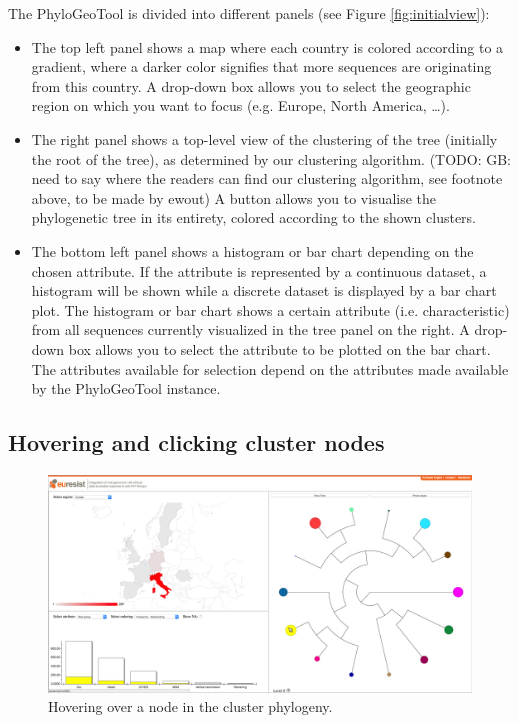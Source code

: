 \documentclass[a4paper, 11pt]{article} %
\begin{document}
The PhyloGeoTool is divided into different panels (see Figure \ref{fig:initialview}): 
\begin{itemize}
  \item The top left panel shows a map where each country is colored according to a gradient, where a darker color signifies that more sequences are originating from this country. 
    A drop-down box allows you to select the geographic region on which you want to focus (e.g. Europe, North America, \ldots).
  \item The right panel shows a top-level view of the clustering of the tree (initially the root of the tree), as determined by our clustering algorithm. (TODO: GB: need to say where the readers can find our clustering algorithm, see footnote above, to be made by ewout)
  A button allows you to visualise the phylogenetic tree in its entirety, colored according to the shown clusters.
  \item The bottom left panel shows a histogram or bar chart depending on the chosen attribute. If the attribute is represented by a continuous dataset, a histogram will be shown while a discrete dataset is displayed by a bar chart plot.
  The histogram or bar chart shows a certain attribute (i.e. characteristic) from all sequences currently visualized in the tree panel on the right. 
  A drop-down box allows you to select the attribute to be plotted on the bar chart. 
  The attributes available for selection depend on the attributes made available by the PhyloGeoTool instance.
\end{itemize}


\subsection{Hovering and clicking cluster nodes}
\begin{figure}[H]
\centering
\includegraphics[scale=0.1875]{images/hover_node.PNG}
\vspace{-0.75cm}
\caption{Hovering over a node in the cluster phylogeny.}
\label{fig:hovernode}
\end{figure}
\end{document}
